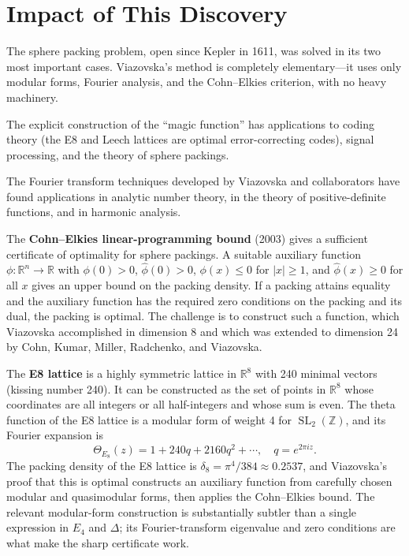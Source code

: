 \section{Impact of This Discovery}

The sphere packing problem, open since Kepler in 1611, was solved in its two most important cases. Viazovska's method is completely elementary---it uses only modular forms, Fourier analysis, and the Cohn--Elkies criterion, with no heavy machinery.

The explicit construction of the ``magic function'' has applications to coding theory (the E8 and Leech lattices are optimal error-correcting codes), signal processing, and the theory of sphere packings.

The Fourier transform techniques developed by Viazovska and collaborators have found applications in analytic number theory, in the theory of positive-definite functions, and in harmonic analysis.

The \textbf{Cohn--Elkies linear-programming bound} (2003) gives a sufficient certificate of optimality for sphere packings. A suitable auxiliary function $\phi: \mathbb{R}^n \to \mathbb{R}$ with $\phi(0)>0$, $\widehat{\phi}(0)>0$, $\phi(x)\le 0$ for $|x|\ge 1$, and $\widehat{\phi}(x)\ge 0$ for all $x$ gives an upper bound on the packing density. If a packing attains equality and the auxiliary function has the required zero conditions on the packing and its dual, the packing is optimal. The challenge is to construct such a function, which Viazovska accomplished in dimension 8 and which was extended to dimension 24 by Cohn, Kumar, Miller, Radchenko, and Viazovska.

The \textbf{E8 lattice} is a highly symmetric lattice in $\mathbb{R}^8$ with 240 minimal vectors (kissing number 240). It can be constructed as the set of points in $\mathbb{R}^8$ whose coordinates are all integers or all half-integers and whose sum is even. The theta function of the E8 lattice is a modular form of weight 4 for $\operatorname{SL}_2(\mathbb{Z})$, and its Fourier expansion is
\[
\Theta_{E_8}(z) = 1 + 240q + 2160q^2 + \cdots, \quad q = e^{2\pi i z}.
\]
The packing density of the E8 lattice is $\delta_8 = \pi^4/384 \approx 0.2537$, and Viazovska's proof \cite{viazovska2016} that this is optimal constructs an auxiliary function from carefully chosen modular and quasimodular forms, then applies the Cohn--Elkies bound. The relevant modular-form construction is substantially subtler than a single expression in $E_4$ and $\Delta$; its Fourier-transform eigenvalue and zero conditions are what make the sharp certificate work.

